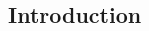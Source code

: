 \documentclass[journal, onecolumn]{aastex631}
\begin{document}
\begin{CJK*}{UTF8}{gbsn}

\section{Introduction} \label{sec:intro}


\end{CJK*}
\end{document}
